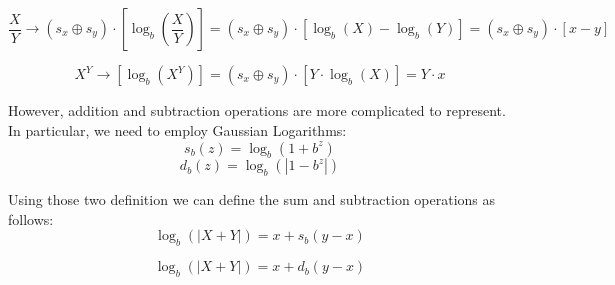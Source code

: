 \begin{equation}
    \frac{X}{Y} \xrightarrow[]{} (s_x \oplus s_y)\cdot \left[ \log_b\left(\frac{X}{Y}\right) \right] = (s_x \oplus s_y)\cdot \left[ \log_b(X) -  \log_b(Y) \right] = (s_x \oplus s_y)\cdot \left[ x-y \right]
\end{equation}

\begin{equation}
    X^Y \xrightarrow[]{} \left[ \log_b(X ^ Y) \right] = (s_x \oplus s_y)\cdot \left[Y \cdot  \log_b(X)  \right] = Y\cdot x
\end{equation}

However, addition and subtraction operations are more complicated to represent. In particular, we need to employ Gaussian Logarithms:
\begin{equation}
    s_b(z) = \log_b (1 + b^z)
\end{equation}
\begin{equation}
    d_b(z) = \log_b (\left | 1 - b^z \right |)
\end{equation}

Using those two definition we can define the sum and subtraction operations as follows:
\begin{equation}
    \log_b(|X + Y|) = x + s_b(y - x) 
\end{equation}

\begin{equation}
    \log_b(|X + Y|) = x + d_b(y - x) 
\end{equation}



